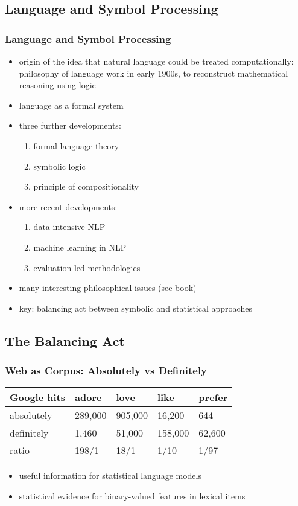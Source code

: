 \documentclass{beamer}             %
\begin{document}
\subsection{Language and Symbol Processing}

\begin{frame}
\frametitle{Language and Symbol Processing}
\begin{itemize}
\item origin of the idea that natural language could be treated computationally: philosophy of language work in early 1900s, to reconstruct mathematical reasoning using logic
\item language as a formal system
\item three further developments:
  \begin{enumerate}
  \item formal language theory
  \item symbolic logic
  \item principle of compositionality
  \end{enumerate}
\item more recent developments:
  \begin{enumerate}
  \item data-intensive NLP
  \item machine learning in NLP
  \item evaluation-led methodologies
  \end{enumerate}
\item many interesting philosophical issues (see book)
\item key: balancing act between symbolic and statistical approaches
\end{itemize}
\end{frame}

\subsection{The Balancing Act}

\begin{frame}
\frametitle{Web as Corpus: Absolutely vs Definitely}
{\small
\begin{tabular}{l|llll}
\textbf{Google hits}
& \textbf{adore}
& \textbf{love}
& \textbf{like}
& \textbf{prefer} \\ \hline
absolutely  & 289,000 & 905,000 & 16,200  & 644 \\
definitely  & 1,460   & 51,000  & 158,000 & 62,600 \\
ratio       & 198/1   & 18/1    & 1/10    & 1/97
\end{tabular}}
\begin{itemize}
\item useful information for statistical language models
\item statistical evidence for binary-valued features in lexical items
\end{itemize}
\end{frame}
\end{document}
